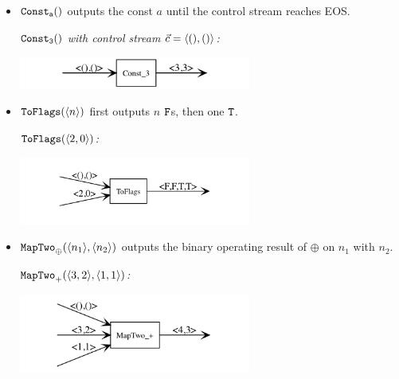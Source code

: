 \begin{itemize}
\renewcommand{\labelitemi}{$-$}
	\item $\mathtt{Const_{a}()}$ outputs the const $a$ until the control stream reaches EOS.
	
	\begin{example} \emph{$\mathtt{Const_{3}()}$ with control stream $\c = \<(),()\'>$:}\\
	\begin{center}
		\includegraphics[width=0.6\textwidth]{fig/const3.png}
	\end{center}
	\end{example}

	\item $\mathtt{ToFlags}(\langle n \rangle)$ first outputs $n$ $\mathtt{F}$s, then one $\mathtt{T}$.
	
	\begin{example} \emph{$\toflagf{\<2,0\'>}$:}\\
		\begin{center}
		\includegraphics[width=0.6\textwidth]{fig/toflag.png}
		\end{center}
	\end{example}
	
	\item $\mathtt{MapTwo}_{\oplus}(\langle n_1 \rangle,\langle n_2 \rangle)$ outputs 
	the binary operating result of $\oplus$ on $n_1$ with $n_2$. 

	\begin{example} \emph{$\maptwof{+}{\<3,2\'>}{\<1,1\'>}$:}\\
		\begin{center}
			\includegraphics[width=0.6\textwidth]{fig/maptwo.png}
		\end{center}
	\end{example}
	

\end{itemize}
